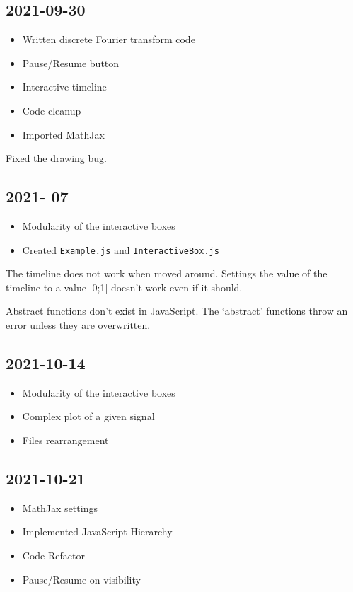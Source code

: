 \documentclass{article}
\begin{document}
\subsection*{2021-09-30}

\begin{itemize}
    \item Written discrete Fourier transform code
    \item Pause/Resume button
    \item Interactive timeline
    \item Code cleanup
    \item Imported MathJax
\end{itemize}

Fixed the drawing bug.

\subsection*{2021-  07}

\begin{itemize}
    \item Modularity of the interactive boxes
    \item Created \texttt{Example.js} and \texttt{InteractiveBox.js}
\end{itemize}

The timeline does not work when moved around.
Settings the value of the timeline to a value [0;1]
doesn't work even if it should.

Abstract functions don't exist in JavaScript.
The `abstract' functions throw an error unless they are overwritten.

\subsection*{2021-10-14}

\begin{itemize}
    \item Modularity of the interactive boxes
    \item Complex plot of a given signal
    \item Files rearrangement
\end{itemize}

\subsection*{2021-10-21}

\begin{itemize}
    \item MathJax settings
    \item Implemented JavaScript Hierarchy
    \item Code Refactor
    \item Pause/Resume on visibility
\end{itemize}
\end{document}
